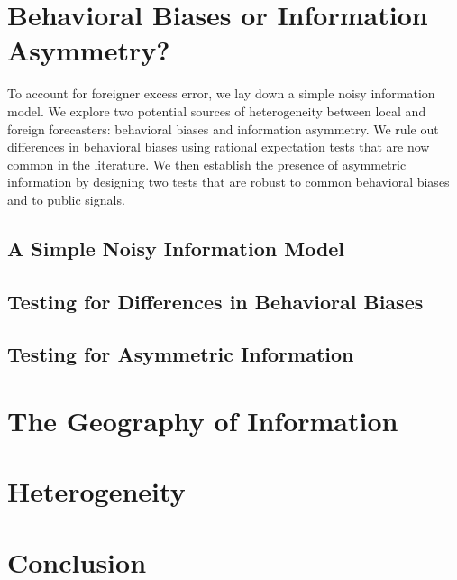 \documentclass[letterpaper,12pt]{article}
\begin{document}
\section{Behavioral Biases or Information Asymmetry?}\label{sec:model}

To account for foreigner excess error, we lay down a simple noisy information model. We explore two potential sources of heterogeneity between local and foreign forecasters: behavioral biases and information asymmetry. We rule out differences in behavioral biases using rational expectation tests that are now common in the literature. We then establish the presence of asymmetric information by designing two tests that are robust to common behavioral biases and to public signals.

\subsection{A Simple Noisy Information Model}


\subsection{Testing for Differences in Behavioral Biases}


\subsection{Testing for Asymmetric Information}


\section{The Geography of Information}\label{sec:geography}


\section{Heterogeneity}\label{sec:heterogeneity}



\section{Conclusion}\label{sec:conclusion}




\end{document}
